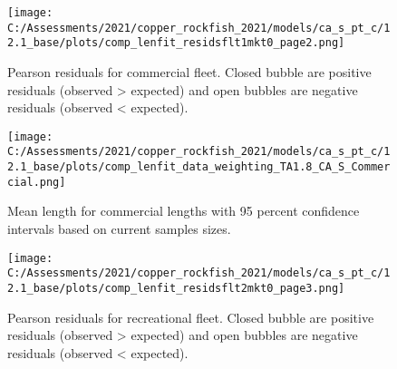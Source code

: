\documentclass[11pt,
  english,
  a4paper,
]{article}
\begin{document}
\tagmcend\tagstructend


\begin{figure}
\centering
\texttt{[image: C:/Assessments/2021/copper\_rockfish\_2021/models/ca\_s\_pt\_c/12.1\_base/plots/comp\_lenfit\_residsflt1mkt0\_page2.png]}
\caption{Pearson residuals for commercial fleet. Closed bubble are positive residuals (observed \textgreater{} expected) and open bubbles are negative residuals (observed \textless{} expected).\label{fig:com-pearson}}
\end{figure}

\tagmcend\tagstructend


\begin{figure}
\centering
\texttt{[image: C:/Assessments/2021/copper\_rockfish\_2021/models/ca\_s\_pt\_c/12.1\_base/plots/comp\_lenfit\_data\_weighting\_TA1.8\_CA\_S\_Commercial.png]}
\caption{Mean length for commercial lengths with 95 percent confidence intervals based on current samples sizes.\label{fig:com-mean-len-fit}}
\end{figure}

\tagmcend\tagstructend


\begin{figure}
\centering
\texttt{[image: C:/Assessments/2021/copper\_rockfish\_2021/models/ca\_s\_pt\_c/12.1\_base/plots/comp\_lenfit\_residsflt2mkt0\_page3.png]}
\caption{Pearson residuals for recreational fleet. Closed bubble are positive residuals (observed \textgreater{} expected) and open bubbles are negative residuals (observed \textless{} expected).\label{fig:rec-pearson}}
\end{figure}

\tagmcend\tagstructend

\end{document}
